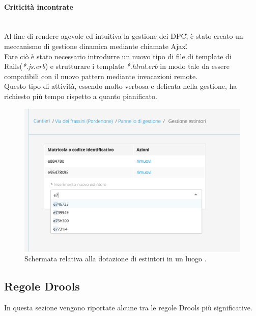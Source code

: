 	\paragraph*{Criticità incontrate}\mbox{}\\
	Al fine di rendere agevole ed intuitiva la gestione dei \gls{DPC}\G, è stato creato un meccanismo di gestione dinamica mediante chiamate \gls{Ajax}\G. \\
	Fare ciò è stato necessario introdurre un nuovo tipo di file di template di Rails(\textit{*.js.erb}) e strutturare i template \textit{*.html.erb} in modo tale da essere compatibili con il nuovo pattern mediante invocazioni remote.\\
	Questo tipo di attività, essendo molto verbosa e delicata nella gestione, ha richiesto più tempo rispetto a quanto pianificato.
		\begin{figure}[H]
			\begin{center}
				\includegraphics[width=12cm]{Pics/ScreenRemoteTrueEstintori.png}
				\caption{Schermata relativa alla dotazione di estintori in un luogo .}
				\label{fig:ScreenRemoteTrueEstintori}
			\end{center}
		\end{figure}
		

\newpage
\subsection{Regole Drools}
\label{Drools:regole}
In questa sezione vengono riportate alcune tra le regole Drools più significative.
